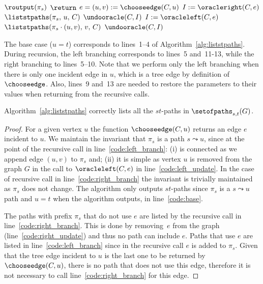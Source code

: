 \begin{algorithm}[t]
	\caption{\label{alg:liststpaths} $\liststpaths(\pi_s,\,u,\,C)$}
\begin{algorithmic}[1]
		\STATE $\routput(\pi_s)$ \label{code:base}
		\STATE $\return$ \label{code:returnbase}
	\ENDIF
	\STATE $e = (u,v) := \chooseedge( C, u )$ \label{code:choose}
		\STATE $I := \oracleright(C,e)$  \label{code:right_update}
		\STATE $\liststpaths(\pi_s,\, u,\,C)$ \label{code:right_branch}
		\STATE $\undooracle(C, I)$ \label{code:right_undo}
	\ENDIF
        \STATE $I := \oracleleft(C,e)$ \label{code:left_update}
        \STATE $\liststpaths( \pi_s \cdot (u,v),\, v,\, C)$ \label{code:left_branch}
        \STATE $\undooracle(C, I)$ \label{code:left_undo}
\end{algorithmic}
\end{algorithm}

The base case ($u=t$) corresponds to lines~1--4 of
Algorithm~\ref{alg:liststpaths}. During recursion, the left branching
corresponds to lines~5 and~11-13, while the right branching to
lines~5--10. Note that we perform only the left branching when there is
only one incident edge in $u$, which is a tree edge by definition of
$\chooseedge$. Also, lines~9 and~13 are needed to restore the
parameters to their values when returning from the recursive
calls.

\begin{lemma}
  \label{lemma:correctness_algo_listpaths}
Algorithm~\ref{alg:liststpaths} correctly lists all the $st$-paths in
  $\setofpaths_{s,t}(G)$.
\end{lemma}
\begin{proof}
  For a given vertex $u$ the function $\chooseedge(C, u)$ returns an
  edge $e$ incident to $u$. We maintain the invariant that $\pi_s$ is
  a path $s \leadsto u$, since at the point of the recursive call in
  line~\ref{code:left_branch}: (i) is connected as we append edge
  $(u,v)$ to $\pi_s$ and; (ii) it is simple as vertex $u$ is removed
  from the graph $G$ in the call to $\oracleleft(C,e)$ in
  line~\ref{code:left_update}. In the case of recursive call in
  line~\ref{code:right_branch} the invariant is trivially maintained
  as $\pi_s$ does not change.
The algorithm only outputs $st$-paths since $\pi_s$ is
  a $s \leadsto u$ path and $u=t$ when the algorithm outputs, in
  line~\ref{code:base}. 

  The paths with prefix $\pi_s$ that do not use $e$ are listed by
  the recursive call in line~\ref{code:right_branch}. This is done by
  removing~$e$ from the graph (line~\ref{code:right_update}) and thus
  no path can include $e$. Paths that use $e$ are listed in
  line~\ref{code:left_branch} since in the recursive call $e$ is added
  to $\pi_s$. Given that the tree edge incident to $u$ is the last one
  to be returned by $\chooseedge(C,u)$, there is no path that does not
  use this edge, therefore it is not necessary to call
  line~\ref{code:right_branch} for this edge.
\end{proof}

